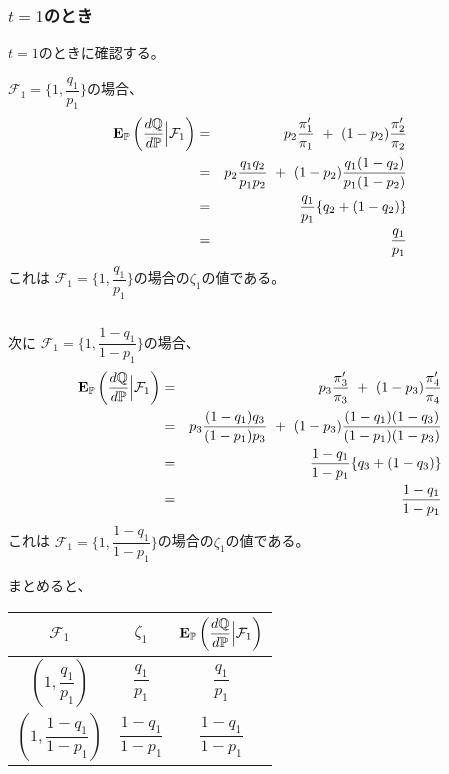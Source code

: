 \documentclass[uplatex,a4j,12pt,dvipdfmx]{jsarticle}
\begin{document}
\subsubsection{$t=1$のとき}

$t=1$のときに確認する。

$\mathcal{F}_{1} = \Big\{ 1 , \dfrac{q_{1}}{p_{1}} \Big\} $の場合、
%
\begin{eqnarray*}
	{\bf E}_{\mathbb{P}}
	\left( \dfrac{ d \mathbb{Q} }{ d \mathbb{P} } \Big| \mathcal{F}_{1} \right)
	&=&
	p_{2} \dfrac{ \pi'_{1} }{ \pi_{1} }
	\ + \
	(1-p_{2}) \dfrac{ \pi'_{2} }{ \pi_{2} }
	\\ &=&
	p_{2} \dfrac{ q_{1} q_{2} }{ p_{1} p_{2} }
	\ + \
	(1-p_{2}) \dfrac{ q_{1} (1-q_{2}) }{ p_{1} (1-p_{2}) }
	\\ &=&
	\dfrac{ q_{1} }{ p_{1} }
	\{ q_{2} + (1-q_{2}) \}
	\\ &=&
	\dfrac{ q_{1} }{ p_{1} }
\end{eqnarray*}
%
これは
$\mathcal{F}_{1} = \Big\{ 1 , \dfrac{q_{1}}{p_{1}} \Big\} $の場合の$\zeta_{1}$の値である。

${}$

次に
$\mathcal{F}_{1} = \Big\{ 1 , \dfrac{1-q_{1}}{1-p_{1}} \Big\} $の場合、
%
\begin{eqnarray*}
	{\bf E}_{\mathbb{P}}
	\left( \dfrac{ d \mathbb{Q} }{ d \mathbb{P} } \Big| \mathcal{F}_{1} \right)
	&=&
	p_{3} \dfrac{ \pi'_{3} }{ \pi_{3} }
	\ + \
	(1-p_{3}) \dfrac{ \pi'_{4} }{ \pi_{4} }
	\\ &=&
	p_{3} \dfrac{ (1-q_{1}) q_{3} }{ (1-p_{1}) p_{3} }
	\ + \
	(1-p_{3}) \dfrac{ (1-q_{1}) (1-q_{3}) }{ (1-p_{1}) (1-p_{3}) }
	\\ &=&
	\dfrac{1-q_{1}}{ 1-p_{1}}
	\{ q_{3} + (1-q_{3}) \}
	\\ &=&
	\dfrac{1-q_{1}}{ 1-p_{1}}
\end{eqnarray*}
%
これは
$\mathcal{F}_{1} = \Big\{ 1 , \dfrac{1-q_{1}}{1-p_{1}} \Big\} $の場合の$\zeta_{1}$の値である。

まとめると、

\begin{center}
	\begin{tabular}{|c|c|c|} \hline
		$\mathcal{F}_{1}$                 & $\zeta_{1}$                & ${\bf E}_{\mathbb{P}} \left( \dfrac{ d \mathbb{Q} }{ d \mathbb{P} } \Big| \mathcal{F}_{1} \right)$ \\ \hline \hline
		$(1 , \dfrac{q_{1}}{p_{1}} )$     & $\dfrac{q_{1}}{p_{1}}$     & $\dfrac{q_{1}}{p_{1}}$                                                                             \\ \hline
		$(1 , \dfrac{1-q_{1}}{1-p_{1}} )$ & $\dfrac{1-q_{1}}{1-p_{1}}$ & $\dfrac{1-q_{1}}{1-p_{1}}$                                                                         \\ \hline
	\end{tabular}
\end{center}
\end{document}
